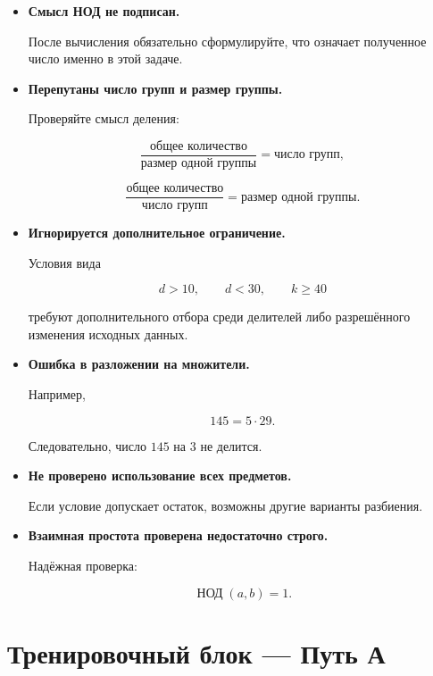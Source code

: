\documentclass[a4paper,12pt]{article}
\newcommand{\mygcd}[2]{
  \mathop{\text{НОД}}\nolimits(#1,#2)
}
\newcommand{\term}[1]{
  \textbf{\textcolor{darkaccent}{#1}}
}
\begin{document}
\begin{itemize}

  \item
  \term{Смысл НОД не подписан.}

  После вычисления обязательно сформулируйте,
  что означает полученное число
  именно в этой задаче.

  \item
  \term{Перепутаны число групп и размер группы.}

  Проверяйте смысл деления:

  \[
  \frac{\text{общее количество}}
       {\text{размер одной группы}}
  =
  \text{число групп},
  \]

  \[
  \frac{\text{общее количество}}
       {\text{число групп}}
  =
  \text{размер одной группы}.
  \]

  \item
  \term{Игнорируется дополнительное ограничение.}

  Условия вида

  \[
  d>10,
  \qquad
  d<30,
  \qquad
  k\ge40
  \]

  требуют дополнительного отбора
  среди делителей
  либо разрешённого изменения исходных данных.

  \item
  \term{Ошибка в разложении на множители.}

  Например,

  \[
  145=5\cdot29.
  \]

  Следовательно, число $145$
  на $3$ не делится.

  \item
  \term{Не проверено использование всех предметов.}

  Если условие допускает остаток,
  возможны другие варианты разбиения.

  \item
  \term{Взаимная простота проверена недостаточно строго.}

  Надёжная проверка:

  \[
  \mygcd{a}{b}=1.
  \]

\end{itemize}


\clearpage

\section*{Тренировочный блок --- Путь А}
\end{document}
